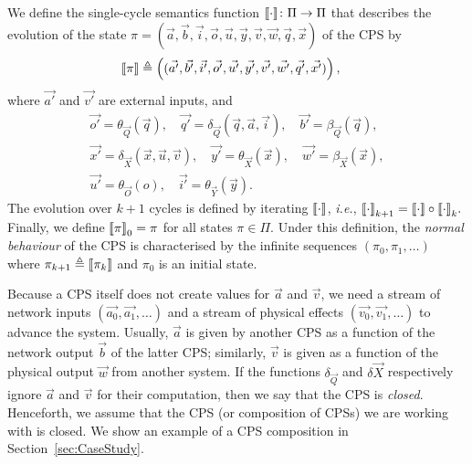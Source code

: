 {\begin{definition}
We define the single-cycle semantics function ${{{\llbracket\cdot\rrbracket}}}\colon \Pi \rightarrow \Pi$ that describes the evolution of the state $\pi=(\vec{a},\vec{b},\vec{i},\vec{o},\vec{u},\vec{y},\vec{v},\vec{w},\vec{q},\vec{x})$ of the CPS by
\begin{align}
{{\llbracket\pi\rrbracket}}&\triangleq\left((\vec{a'},\vec{b'},\vec{i'},\vec{o'},\vec{u'},\vec{y'},\vec{v'},\vec{w'},\vec{q'},\vec{x'})\right), 
\end{align}
where $\vec{a'}$ and $\vec{v'}$ are external inputs, and 
\begin{gather*}
\vec{o'}=\theta_{\vec{Q}}(\vec{q}),\quad 
\vec{q'}=\delta_{\vec{Q}}(\vec{q},\vec{a},\vec{i}),\quad 
\vec{b'}=\beta_{\vec{Q}}(\vec{q}),\\
\vec{x'}=\delta_{\vec{X}}(\vec{x},\vec{u},\vec{v}),\quad
\vec{y'}=\theta_{\vec{X}}(\vec{x}),\quad 
\vec{w'}=\beta_{\vec{X}}(\vec{x}),\\
\vec{u'}= \theta_{\vec{O}}(o),\quad\vec{i'}=\theta_{\vec{Y}}(\vec{y}).
\end{gather*}
The evolution over $k+1$ cycles is defined by iterating ${{{\llbracket\cdot\rrbracket}}}$, \emph{i.e.}, 
${{{\llbracket\cdot\rrbracket}}}_{k+1}= {{{\llbracket\cdot\rrbracket}}} \circ {{{\llbracket\cdot\rrbracket}}}_{k}.$
Finally, we define ${{\llbracket\pi\rrbracket}}_{0}=\pi$ for all states $\pi \in \Pi$. Under this definition, the \emph{normal behaviour} of the CPS is characterised by the infinite sequences $(\pi_0, \pi_1, \ldots)$ where $\pi_{k+1}\triangleq{{\llbracket\pi_k\rrbracket}}$ and $\pi_0$ is an initial state.%
\end{definition}
}
Because a CPS itself does not create values for $\vec{a}$ and $\vec{v}$, we need a stream of network inputs $(\vec{a_0}, \vec{a_1}, \ldots)$ and a stream of physical effects $(\vec{v_0}, \vec{v_1}, \ldots)$ to advance the system. Usually, $\vec{a}$ is given by another CPS as a function of the network output $\vec{b}$ of the latter CPS; similarly, $\vec{v}$ is given as a function of the physical output $\vec{w}$ from another system. If the functions $\delta_{\vec{Q}}$ and $\delta{\vec{X}}$ respectively ignore $\vec{a}$ and $\vec{v}$ for their computation, then we say that the CPS is \emph{closed}.
Henceforth, we assume that the CPS (or composition of CPSs) we are working with is closed. We show an example of a CPS composition in Section~\ref{sec:CaseStudy}.

